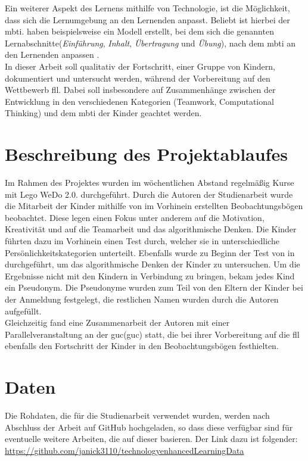 Ein weiterer Aspekt des Lernens mithilfe von Technologie, ist die Möglichkeit, dass sich die Lernumgebung an den Lernenden anpasst. Beliebt ist hierbei der \acrlong{mbti}. \citeauthor{yel_adaptive_2018} haben beispielsweise ein Modell erstellt, bei dem sich die genannten Lernabschnitte(\textit{Einführung}, \textit{Inhalt}, \textit{Übertragung} und \textit{Übung}), nach dem \acrshort{mbti} an den Lernenden anpassen \cite{yel_adaptive_2018}.\\
In dieser Arbeit soll qualitativ der Fortschritt, einer Gruppe von Kindern, dokumentiert und untersucht werden, während der Vorbereitung auf den Wettbewerb \acrlong{fll}. Dabei soll insbesondere auf Zusammenhänge zwischen der Entwicklung in den verschiedenen Kategorien (Teamwork, Computational Thinking) und dem \acrshort{mbti} der Kinder geachtet werden.



\section{Beschreibung des Projektablaufes}
Im Rahmen des Projektes wurden im wöchentlichen Abstand regelmäßig Kurse mit Lego WeDo 2.0. durchgeführt. Durch die Autoren der Studienarbeit wurde die Mitarbeit der Kinder mithilfe von im Vorhinein erstellten Beobachtungsbögen beobachtet. Diese legen einen Fokus unter anderem auf die Motivation, Kreativität und auf die Teamarbeit und das algorithmische Denken. Die Kinder führten dazu im Vorhinein einen Test durch, welcher sie in unterschiedliche Persönlichkeitskategorien unterteilt. Ebenfalls wurde zu Beginn der Test von \citeauthor{zapata_bctt_2021} in  durchgeführt, um das algorithmische Denken der Kinder zu untersuchen.
Um die Ergebnisse nicht mit den Kindern in Verbindung zu bringen, bekam jedes Kind ein Pseudonym. Die Pseudonyme wurden zum Teil von den Eltern der Kinder bei der Anmeldung festgelegt, die restlichen Namen wurden durch die Autoren aufgefüllt.\\
Gleichzeitig fand eine Zusammenarbeit der Autoren mit einer Parallelveranstaltung an der \acrlong{guc}(\acrshort{guc}) statt, die bei ihrer Vorbereitung auf die \acrshort{fll} ebenfalls den Fortschritt der Kinder in den Beobachtungsbögen festhielten.


\section{Daten}
Die Rohdaten, die für die Studienarbeit verwendet wurden, werden nach Abschluss der Arbeit auf GitHub hochgeladen, so dass diese verfügbar sind für eventuelle weitere Arbeiten, die auf dieser basieren. Der Link dazu ist folgender: \url{https://github.com/janick3110/technologyenhancedLearningData}